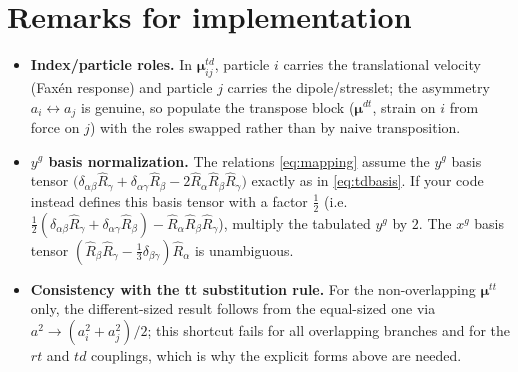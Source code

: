\documentclass[11pt]{article}
\newcommand{\Rhh}[1]{\hat{R}_{#1}}
\newcommand{\third}{\tfrac{1}{3}}
\begin{document}
\section*{Remarks for implementation}
\begin{itemize}[leftmargin=1.4em]
\item \textbf{Index/particle roles.} In $\bm{\mu}^{td}_{ij}$, particle $i$ carries the
translational velocity (Fax\'en response) and particle $j$ carries the dipole/stresslet;
the asymmetry $a_i\leftrightarrow a_j$ is genuine, so populate the transpose block
($\bm{\mu}^{dt}$, strain on $i$ from force on $j$) with the roles swapped rather than by
naive transposition.
\item \textbf{$y^g$ basis normalization.} The relations \eqref{eq:mapping} assume the
$y^g$ basis tensor $\big(\delta_{\alpha\beta}\Rhh{\gamma}+\delta_{\alpha\gamma}\Rhh{\beta}
-2\Rhh{\alpha}\Rhh{\beta}\Rhh{\gamma}\big)$ exactly as in \eqref{eq:tdbasis}.  If your code
instead defines this basis tensor with a factor $\tfrac12$ (i.e.\
$\tfrac12(\delta_{\alpha\beta}\Rhh{\gamma}+\delta_{\alpha\gamma}\Rhh{\beta})
-\Rhh{\alpha}\Rhh{\beta}\Rhh{\gamma}$), multiply the tabulated $y^g$ by $2$.  The $x^g$
basis tensor $(\Rhh{\beta}\Rhh{\gamma}-\third\delta_{\beta\gamma})\Rhh{\alpha}$ is
unambiguous.
\item \textbf{Consistency with the tt substitution rule.} For the non-overlapping
$\bm{\mu}^{tt}$ only, the different-sized result follows from the equal-sized one via
$a^2\to(a_i^2+a_j^2)/2$; this shortcut fails for all overlapping branches and for the
$rt$ and $td$ couplings, which is why the explicit forms above are needed.
\end{itemize}
\end{document}
